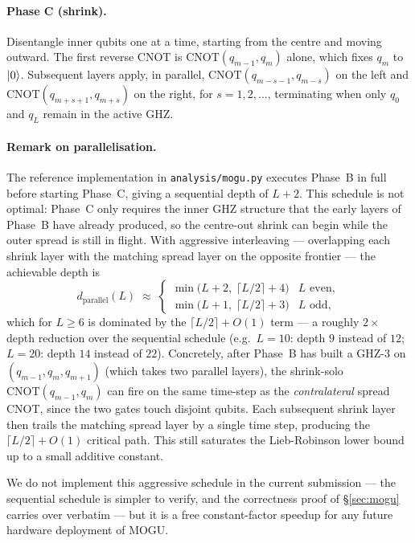 \documentclass[11pt,a4paper]{article}
\theoremstyle{definition}
\newcommand{\CNOT}{\mathrm{CNOT}}
\begin{document}
\paragraph{Phase C (shrink).} Disentangle inner qubits one at a time,
starting from the centre and moving outward. The first reverse CNOT is
$\CNOT(q_{m-1},q_m)$ alone, which fixes $q_m$ to $\ket 0$. Subsequent
layers apply, in parallel, $\CNOT(q_{m-s-1},q_{m-s})$ on the left and
$\CNOT(q_{m+s+1},q_{m+s})$ on the right, for $s=1,2,\dots$, terminating
when only $q_0$ and $q_L$ remain in the active GHZ.

\paragraph{Remark on parallelisation.}
\label{par:mogu-parallel}
The reference implementation in \texttt{analysis/mogu.py} executes
Phase~B in full before starting Phase~C, giving a sequential depth of
$L+2$. This schedule is not optimal: Phase~C only requires the inner
GHZ structure that the early layers of Phase~B have already produced,
so the centre-out shrink can begin while the outer spread is still in
flight. With aggressive interleaving — overlapping each shrink layer
with the matching spread layer on the opposite frontier — the
achievable depth is
\begin{equation}
\boxed{\;
  d_{\text{parallel}}(L) \;\approx\;
  \begin{cases}
    \min\!\bigl(L+2,\;\lceil L/2\rceil+4\bigr) & L\text{ even},\\[2pt]
    \min\!\bigl(L+1,\;\lceil L/2\rceil+3\bigr) & L\text{ odd},
  \end{cases}\;}
\end{equation}
which for $L\ge 6$ is dominated by the $\lceil L/2\rceil + O(1)$ term
— a roughly $2\times$ depth reduction over the sequential schedule
(e.g.\ $L=10$: depth $9$ instead of $12$; $L=20$: depth $14$ instead of
$22$). Concretely, after Phase~B has built a GHZ-3 on
$(q_{m-1},q_m,q_{m+1})$ (which takes two parallel layers), the
shrink-solo $\CNOT(q_{m-1},q_m)$ can fire on the same time-step as the
\emph{contralateral} spread CNOT, since the two gates touch disjoint
qubits. Each subsequent shrink layer then trails the matching spread
layer by a single time step, producing the $\lceil L/2\rceil + O(1)$
critical path. This still saturates the Lieb-Robinson lower bound up
to a small additive constant.

We do not implement this aggressive schedule in the current submission
— the sequential schedule is simpler to verify, and the
correctness proof of \S\ref{sec:mogu} carries over verbatim — but it
is a free constant-factor speedup for any future hardware deployment
of MOGU.
\end{document}
